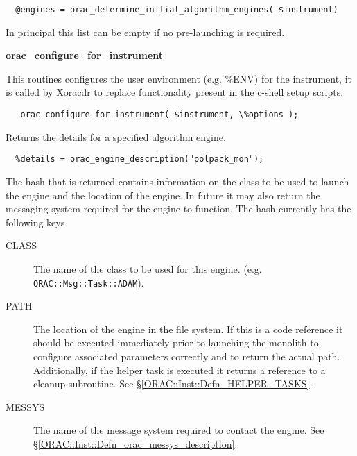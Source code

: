 \begin{description}
\begin{verbatim}
  @engines = orac_determine_initial_algorithm_engines( $instrument)
\end{verbatim}


In principal this list can be empty if no pre-launching is required.

\item \textbf{\textbf{orac\_configure\_for\_instrument}}

This routines configures the user environment (e.g. \%ENV) for the instrument, 
it is called by Xoracdr to replace functionality present in the c-shell setup scripts.

\begin{verbatim}
   orac_configure_for_instrument( $instrument, \%options );
\end{verbatim}
\item[\textbf{orac\_engine\_description}] \mbox{}

Returns the details for a specified algorithm engine.

\begin{verbatim}
  %details = orac_engine_description("polpack_mon");
\end{verbatim}


The hash that is returned contains information on the
class to be used to launch the engine and the location
of the engine. In future it may also return the messaging
system required for the engine to function. The hash currently
has the following keys

\begin{description}
\item[CLASS] \mbox{}

The name of the class to be used for this engine.
(e.g. \texttt{ORAC::Msg::Task::ADAM}).

\item[PATH] \mbox{}

The location of the engine in the file system. If this
is a code reference it should be executed immediately
prior to launching the monolith to configure associated
parameters correctly and to return the actual path.
Additionally, if the helper task is executed it returns
a reference to a cleanup subroutine. See \S\ref{ORAC::Inst::Defn_HELPER_TASKS}.

\item[MESSYS] \mbox{}

The name of the message system required to contact the engine.
See \S\ref{ORAC::Inst::Defn_orac_messys_description}.


\end{description}
\end{description}
